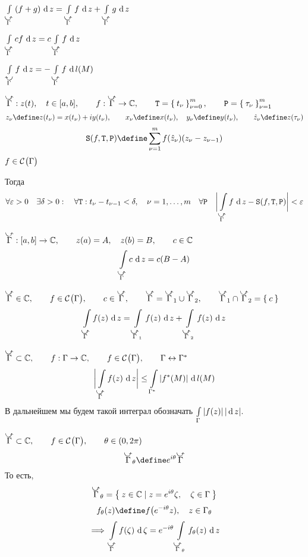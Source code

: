 \begin{props}
	\item $ \cint[z]{\curvedir\Gamma}{(f + g)} = \cint[z]{\curvedir\Gamma}f + \cint[z]{\curvedir\Gamma}g $

	\item $ \cint[z]{\curvedir\Gamma}{cf} = c \cint[z]{\curvedir\Gamma}f $

	\item $ \cint[z]{\curvedir[0]\Gamma}f = - \cint{\curvedir\Gamma}f $

	\item $ \curvedir\Gamma : z(t), \quad t \in [a, b], \qquad f : \curvedir\Gamma \to \Co, \qquad \mathtt T = \seqz[m]{t_\nu}\nu, \qquad \mathtt P = \seq[m]{\tau_\nu}\nu $
	$$ z_\nu \define z(t_\nu) = x(t_\nu) + iy(t_\nu), \qquad x_\nu \define x(t_\nu), \quad y_\nu \define y(t_\nu), \qquad \hat z_\nu \define z(\tau_\nu) $$
	$$ \mathtt S(f, \mathtt T, \mathtt P) \define \sum_{\nu = 1}^m f(\hat z_\nu) (z_\nu - z_{\nu - 1}) $$
	$ f \in \mathcal{C}^{} \big( {\Gamma} \big)  $

	Тогда
	$$ \forall \eps > 0 \quad \exists \delta > 0 : \quad \forall \mathtt T : t_\nu - t_{\nu - 1} < \delta, \quad \nu = 1, \dots, m \quad \forall \mathtt P \quad \bigg| \cint[z]{\curvedir\Gamma}f - \mathtt S(f, \mathtt T, \mathtt P) \bigg| < \eps $$

	\item\label{it:curve_it:5} $ \curvedir\Gamma : [a, b] \to \Co, \qquad z(a) = A, \quad z(b) = B, \qquad c \in \Co $
	$$ \cint[z]{\curvedir\Gamma}c = c(B - A) $$

	\item\label{it:curve_int:6} $ \curvedir \Gamma \in \Co, \qquad f \in \Cont \Gamma, \qquad c \in \curvedir \Gamma, \qquad \curvedir \Gamma = \curvedir \Gamma_1 \cup \curvedir \Gamma_2, \qquad \curvedir\Gamma_1 \cap \curvedir\Gamma_2 = \set c $
		$$ \cint[z]{\curvedir \Gamma}{f(z)} = \cint[z]{\curvedir\Gamma_1}{f(z)} + \cint[z]{\curvedir\Gamma_2}{f(z)} $$

	\item\label{it:curve_int:7} $ \curvedir\Gamma \sub \Co, \qquad f : \Gamma \to \Co, \qquad f \in \Cont \Gamma, \qquad \Gamma \leftrightarrow \Gamma^* $
	$$ \bigg| \cint[z]{\curvedir\Gamma}{f(z)} \bigg| \le \cint{\Gamma^*}{|f^*(M)|} $$
	В дальнейшем мы будем такой интеграл обозначать $ \int\limits_{\Gamma} {|f(z)|} \, |\operatorname{d} {z}| $.

	\item\label{it:curve_int:8} $ \curvedir\Gamma \sub \Co, \qquad f \in \Cont \Gamma, \qquad \theta \in (0, 2\pi) $
		$$ \curvedir\Gamma_\theta \define e^{i\theta}\curvedir\Gamma $$
		То есть,
		$$ \curvedir\Gamma_\theta = \set{z \in \Co \mid z = e^{i\theta}\zeta, \quad \zeta \in \Gamma} $$
		$$ f_\theta(z) \define f \big( e^{-i\theta}z), \quad z \in \Gamma_\theta $$
		$$ \implies \cint[\zeta]{\curvedir\Gamma}{f(\zeta)} = e^{-i\theta} \cint[z]{\curvedir\Gamma_\theta}{f_\theta(z)} $$
\end{props}

